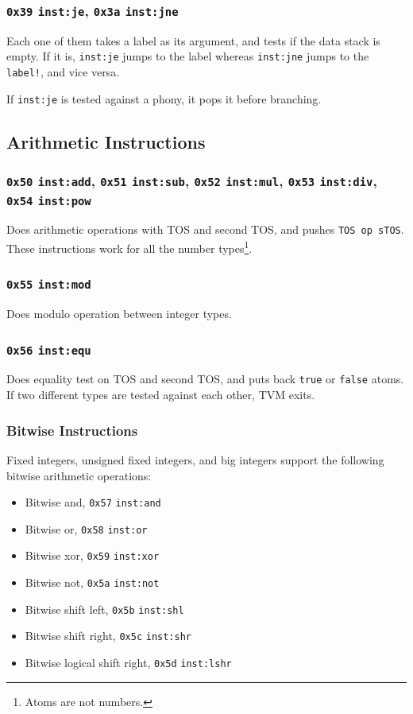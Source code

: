 \documentclass{article}
\newcommand{\inst}[1] {\texttt{inst:#1}}
\begin{document}
\subsubsection{\texttt{0x39} \inst{je}, \texttt{0x3a} \inst{jne}}

Each one of them takes a label as its argument, and tests if the data stack is empty. If it is, \inst{je} jumps to the label whereas \inst{jne} jumps to the \texttt{label!}, and vice versa.

If \inst{je} is tested against a phony, it pops it before branching.

\subsection{Arithmetic Instructions}

\subsubsection{\texttt{0x50} \inst{add}, \texttt{0x51} \inst{sub}, \texttt{0x52} \inst{mul}, \texttt{0x53} \inst{div}, \texttt{0x54} \inst{pow}}

Does arithmetic operations with TOS and second TOS, and pushes \texttt{TOS op sTOS}. These instructions work for all the number types\footnote{Atoms are not numbers.}.

\subsubsection{\texttt{0x55} \inst{mod}}

Does modulo operation between integer types.

\subsubsection{\texttt{0x56} \inst{equ}}

Does equality test on TOS and second TOS, and puts back \texttt{true} or \texttt{false} atoms. If two different types are tested against each other, TVM exits.

\subsubsection{Bitwise Instructions}

Fixed integers, unsigned fixed integers, and big integers support the following bitwise arithmetic operations:
\begin{itemize}
\item Bitwise and, \texttt{0x57} \inst{and}
\item Bitwise or, \texttt{0x58} \inst{or}
\item Bitwise xor, \texttt{0x59} \inst{xor}
\item Bitwise not, \texttt{0x5a} \inst{not}
\item Bitwise shift left, \texttt{0x5b} \inst{shl}
\item Bitwise shift right, \texttt{0x5c} \inst{shr}
\item Bitwise logical shift right, \texttt{0x5d} \inst{lshr}
\end{itemize}
\end{document}
